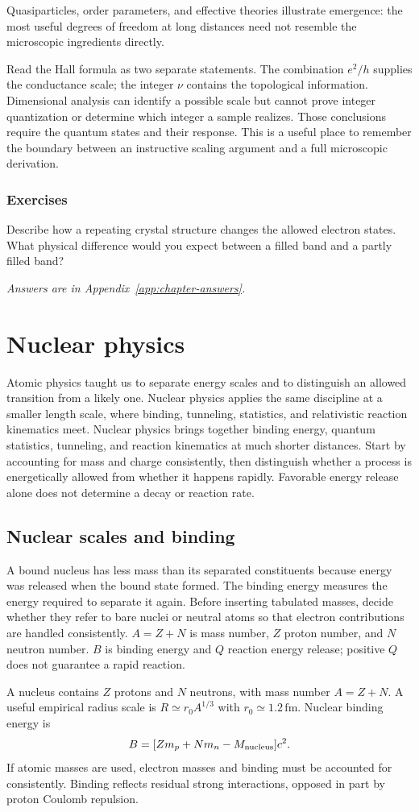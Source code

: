 \documentclass[11pt,oneside]{book}
\theoremstyle{reviewstyle}
\newcommand{\learningcheck}[1]{\subsection*{Exercises}\noindent #1\par\smallskip\noindent\emph{Answers are in Appendix~\ref{app:chapter-answers}.}}
\begin{document}
Quasiparticles, order parameters, and effective theories illustrate emergence: the most useful degrees of freedom at long distances need not resemble the microscopic ingredients directly.

Read the Hall formula as two separate statements. The combination $e^2/h$ supplies the conductance scale; the integer $\nu$ contains the topological information. Dimensional analysis can identify a possible scale but cannot prove integer quantization or determine which integer a sample realizes. Those conclusions require the quantum states and their response. This is a useful place to remember the boundary between an instructive scaling argument and a full microscopic derivation.

\learningcheck{Describe how a repeating crystal structure changes the allowed electron states. What physical difference would you expect between a filled band and a partly filled band?}

\chapter{Nuclear physics}
Atomic physics taught us to separate energy scales and to distinguish an allowed transition from a likely one. Nuclear physics applies the same discipline at a smaller length scale, where binding, tunneling, statistics, and relativistic reaction kinematics meet.
Nuclear physics brings together binding energy, quantum statistics, tunneling, and reaction kinematics at much shorter distances. Start by accounting for mass and charge consistently, then distinguish whether a process is energetically allowed from whether it happens rapidly. Favorable energy release alone does not determine a decay or reaction rate.

\section{Nuclear scales and binding}
A bound nucleus has less mass than its separated constituents because energy was released when the bound state formed. The binding energy measures the energy required to separate it again. Before inserting tabulated masses, decide whether they refer to bare nuclei or neutral atoms so that electron contributions are handled consistently. $A=Z+N$ is mass number, $Z$ proton number, and $N$ neutron number. $B$ is binding energy and $Q$ reaction energy release; positive $Q$ does not guarantee a rapid reaction.

A nucleus contains $Z$ protons and $N$ neutrons, with mass number $A=Z+N$. A useful empirical radius scale is $R\simeq r_0A^{1/3}$ with $r_0\simeq1.2\,\mathrm{fm}$. Nuclear binding energy is
\begin{equation}B=[Zm_p+Nm_n-M_{\rm nucleus}]c^2.\end{equation}
If atomic masses are used, electron masses and binding must be accounted for consistently. Binding reflects residual strong interactions, opposed in part by proton Coulomb repulsion.
\end{document}
